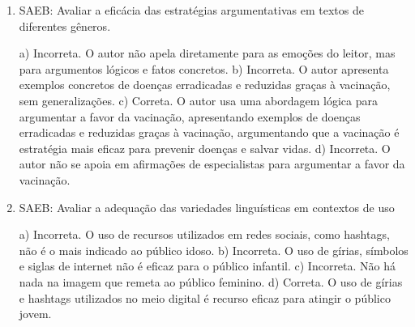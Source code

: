 \begin{enumerate}
	\item
SAEB: Avaliar a eficácia das estratégias argumentativas em textos de
diferentes gêneros.

a) Incorreta. O autor não apela diretamente para as emoções do leitor,
mas para argumentos lógicos e fatos concretos.
b) Incorreta. O autor apresenta exemplos concretos de doenças
erradicadas e reduzidas graças à vacinação, sem generalizações.
c) Correta. O autor usa uma abordagem lógica para argumentar a favor da
vacinação, apresentando exemplos de doenças erradicadas e reduzidas
graças à vacinação, argumentando que a vacinação é estratégia mais
eficaz para prevenir doenças e salvar vidas.
d) Incorreta. O autor não se apoia em afirmações de especialistas para
argumentar a favor da vacinação.

	\item
SAEB: Avaliar a adequação das variedades linguísticas em contextos de uso

a) Incorreta. O uso de recursos utilizados em redes sociais, como hashtags, 
não é o mais indicado ao público idoso.
b) Incorreta. O uso de gírias, símbolos e siglas de internet não é eficaz 
para o público infantil.
c) Incorreta. Não há nada na imagem que remeta ao público feminino.
d) Correta. O uso de gírias e hashtags utilizados no meio
digital é recurso eficaz para atingir o público jovem.
\end{enumerate}



